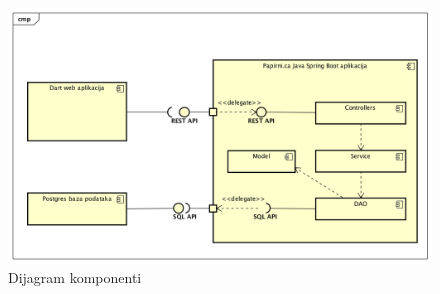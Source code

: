 			\begin{figure}[H]
				\includegraphics[scale=0.55]{dijagrami/dij_komp.PNG} 
				\centering
				\caption{Dijagram komponenti}
				\label{fig:dij_komp}%
			\end{figure}
		
